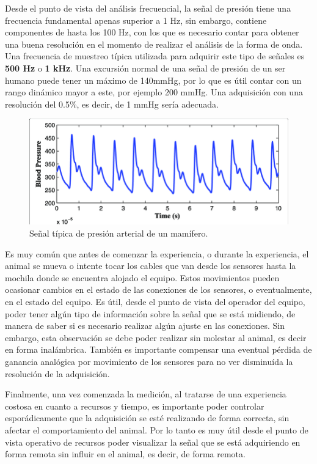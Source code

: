 Desde el punto de vista del análisis frecuencial, la señal de presión tiene una frecuencia fundamental apenas superior a 1 Hz, sin embargo, contiene componentes de hasta los 100 Hz, con los que es necesario contar para obtener una buena resolución en el momento de realizar el análisis de la forma de onda. Una frecuencia de muestreo típica utilizada para adquirir este tipo de señales es \textbf{500 Hz} o \textbf{1 kHz}. Una excursión normal de una señal de presión de un ser humano puede tener un máximo de 140mmHg, por lo que es útil contar con un rango dinámico mayor a este, por ejemplo 200 mmHg. Una adquisición con una resolución del 0.5\%, es decir, de 1 mmHg sería adecuada.

\begin{figure}[!htbp]
	\centering
	\includegraphics[width=\textwidth]{./Figures/senpresion.png}
	\caption{Señal típica de presión arterial de un mamífero.}
	\label{fig:senpresion}
\end{figure}

Es muy común que antes de comenzar la experiencia, o durante la experiencia, el animal se mueva o intente tocar los cables que van desde los sensores hasta la mochila donde se encuentra alojado el equipo. Estos movimientos pueden ocasionar cambios en el estado de las conexiones de los sensores, o eventualmente, en el estado del equipo. Es útil, desde el punto de vista del operador del equipo, poder tener algún tipo de información sobre la señal que se está midiendo, de manera de saber si es necesario realizar algún ajuste en las conexiones. Sin embargo, esta observación se debe poder realizar sin molestar al animal, es decir en forma inalámbrica. También es importante compensar una eventual pérdida de ganancia analógica por movimiento de los sensores para no ver disminuída la resolución de la adquisición. 

Finalmente, una vez comenzada la medición, al tratarse de una experiencia costosa en cuanto a recursos y tiempo, es importante poder controlar esporádicamente que la adquisición se esté realizando de forma correcta, sin afectar el comportamiento del animal. Por lo tanto es muy útil desde el punto de vista operativo de recursos poder visualizar la señal que se está adquiriendo en forma remota sin influir en el animal, es decir, de forma remota.


